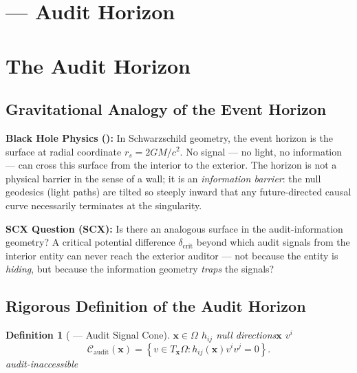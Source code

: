 \documentclass[12pt,a4paper]{article}
\newtheorem{definition}[theorem]{Definition}
\theoremstyle{remark}
\newcommand{\x}{\mathbf{x}}
\begin{document}
\section{ — Audit Horizon}
\section{The Audit Horizon}

\subsection{}
\subsection{Gravitational Analogy of the Event Horizon}

\noindent
\textbf{Black Hole Physics ():} In Schwarzschild geometry, the event horizon is the surface at radial coordinate $r_s = 2GM/c^2$. No signal — no light, no information — can cross this surface from the interior to the exterior. The horizon is not a physical barrier in the sense of a wall; it is an \textit{information barrier}: the null geodesics (light paths) are tilted so steeply inward that any future-directed causal curve necessarily terminates at the singularity.

\vspace{6pt}
\noindent
\textbf{SCX Question (SCX):} Is there an analogous surface in the audit-information geometry? A critical potential difference $\delta_{\mathrm{crit}}$ beyond which audit signals from the interior entity can never reach the exterior auditor — not because the entity is \textit{hiding}, but because the information geometry \textit{traps} the signals?

\subsection{}
\subsection{Rigorous Definition of the Audit Horizon}

\begin{definition}[ — Audit Signal Cone]\label{def:signal_cone}
 $\x \in \Omega$  $h_{ij}$ null directions$\x$\textbf{} $v^i$ 
\begin{equation}
    \mathcal{C}_{\mathrm{audit}}(\x) = \left\{ v \in T_{\x}\Omega : h_{ij}(\x) v^i v^j = 0 \right\}.
\end{equation}
\textbf{}audit-inaccessible
\end{definition}
\end{document}
